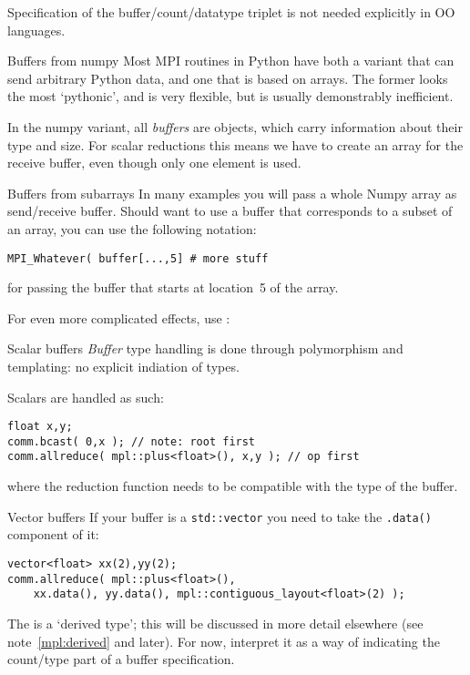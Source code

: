 Specification of the buffer/count/datatype triplet is not
needed explicitly in \ac{OO} languages.

\begin{pythonnote}{Buffers from numpy}
  Most MPI routines in Python have both a variant that can send arbitrary Python data,
  and one that is based on  arrays.
  The former looks the most `pythonic', and is very flexible,
  but is usually demonstrably inefficient.

  In the numpy variant, all \emph{buffers}
  are  objects, which carry information about their type and size.
  For scalar reductions this means we have to create an array for the receive buffer,
  even though only one element is used.
\end{pythonnote}

\begin{pythonnote}{Buffers from subarrays}
  In many examples you will pass a whole Numpy array as send/receive buffer.
  Should want to use a buffer that corresponds to a subset of an array,
  you can use the following notation:
\begin{lstlisting}
MPI_Whatever( buffer[...,5] # more stuff    
\end{lstlisting}
for passing the buffer that starts at location~5 of the array.

For even more complicated effects, use :

\end{pythonnote}

\begin{mplnote}{Scalar buffers}
  \label{mpl:buf-scalar}
  \emph{Buffer} type handling
  is done through polymorphism and templating: no explicit indiation of types.

  Scalars are handled as such:
\begin{lstlisting}
float x,y;
comm.bcast( 0,x ); // note: root first
comm.allreduce( mpl::plus<float>(), x,y ); // op first
\end{lstlisting}
where the reduction function needs to be compatible with the type of the buffer.
\end{mplnote}

\begin{mplnote}{Vector buffers}
  \label{mpl:vec-buf}
If your buffer is a \lstinline+std::vector+ you need
to take the \lstinline+.data()+ component of it:
\begin{lstlisting}
vector<float> xx(2),yy(2);
comm.allreduce( mpl::plus<float>(),
    xx.data(), yy.data(), mpl::contiguous_layout<float>(2) );
\end{lstlisting}
  The  is a `derived type';
this will be discussed in more detail elsewhere
(see note~\ref{mpl:derived} and later).
For now, interpret it as a way of indicating the count/type
part of a buffer specification.
\end{mplnote}


